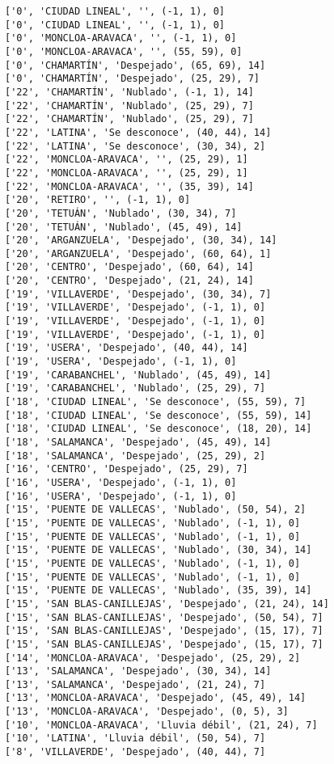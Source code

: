 \documentclass[11pt]{article}
\begin{document}
\begin{Verbatim}[commandchars=\\\{\}]
['0', 'CIUDAD LINEAL', '', (-1, 1), 0]
['0', 'CIUDAD LINEAL', '', (-1, 1), 0]
['0', 'MONCLOA-ARAVACA', '', (-1, 1), 0]
['0', 'MONCLOA-ARAVACA', '', (55, 59), 0]
['0', 'CHAMARTÍN', 'Despejado', (65, 69), 14]
['0', 'CHAMARTÍN', 'Despejado', (25, 29), 7]
['22', 'CHAMARTÍN', 'Nublado', (-1, 1), 14]
['22', 'CHAMARTÍN', 'Nublado', (25, 29), 7]
['22', 'CHAMARTÍN', 'Nublado', (25, 29), 7]
['22', 'LATINA', 'Se desconoce', (40, 44), 14]
['22', 'LATINA', 'Se desconoce', (30, 34), 2]
['22', 'MONCLOA-ARAVACA', '', (25, 29), 1]
['22', 'MONCLOA-ARAVACA', '', (25, 29), 1]
['22', 'MONCLOA-ARAVACA', '', (35, 39), 14]
['20', 'RETIRO', '', (-1, 1), 0]
['20', 'TETUÁN', 'Nublado', (30, 34), 7]
['20', 'TETUÁN', 'Nublado', (45, 49), 14]
['20', 'ARGANZUELA', 'Despejado', (30, 34), 14]
['20', 'ARGANZUELA', 'Despejado', (60, 64), 1]
['20', 'CENTRO', 'Despejado', (60, 64), 14]
['20', 'CENTRO', 'Despejado', (21, 24), 14]
['19', 'VILLAVERDE', 'Despejado', (30, 34), 7]
['19', 'VILLAVERDE', 'Despejado', (-1, 1), 0]
['19', 'VILLAVERDE', 'Despejado', (-1, 1), 0]
['19', 'VILLAVERDE', 'Despejado', (-1, 1), 0]
['19', 'USERA', 'Despejado', (40, 44), 14]
['19', 'USERA', 'Despejado', (-1, 1), 0]
['19', 'CARABANCHEL', 'Nublado', (45, 49), 14]
['19', 'CARABANCHEL', 'Nublado', (25, 29), 7]
['18', 'CIUDAD LINEAL', 'Se desconoce', (55, 59), 7]
['18', 'CIUDAD LINEAL', 'Se desconoce', (55, 59), 14]
['18', 'CIUDAD LINEAL', 'Se desconoce', (18, 20), 14]
['18', 'SALAMANCA', 'Despejado', (45, 49), 14]
['18', 'SALAMANCA', 'Despejado', (25, 29), 2]
['16', 'CENTRO', 'Despejado', (25, 29), 7]
['16', 'USERA', 'Despejado', (-1, 1), 0]
['16', 'USERA', 'Despejado', (-1, 1), 0]
['15', 'PUENTE DE VALLECAS', 'Nublado', (50, 54), 2]
['15', 'PUENTE DE VALLECAS', 'Nublado', (-1, 1), 0]
['15', 'PUENTE DE VALLECAS', 'Nublado', (-1, 1), 0]
['15', 'PUENTE DE VALLECAS', 'Nublado', (30, 34), 14]
['15', 'PUENTE DE VALLECAS', 'Nublado', (-1, 1), 0]
['15', 'PUENTE DE VALLECAS', 'Nublado', (-1, 1), 0]
['15', 'PUENTE DE VALLECAS', 'Nublado', (35, 39), 14]
['15', 'SAN BLAS-CANILLEJAS', 'Despejado', (21, 24), 14]
['15', 'SAN BLAS-CANILLEJAS', 'Despejado', (50, 54), 7]
['15', 'SAN BLAS-CANILLEJAS', 'Despejado', (15, 17), 7]
['15', 'SAN BLAS-CANILLEJAS', 'Despejado', (15, 17), 7]
['14', 'MONCLOA-ARAVACA', 'Despejado', (25, 29), 2]
['13', 'SALAMANCA', 'Despejado', (30, 34), 14]
['13', 'SALAMANCA', 'Despejado', (21, 24), 7]
['13', 'MONCLOA-ARAVACA', 'Despejado', (45, 49), 14]
['13', 'MONCLOA-ARAVACA', 'Despejado', (0, 5), 3]
['10', 'MONCLOA-ARAVACA', 'Lluvia débil', (21, 24), 7]
['10', 'LATINA', 'Lluvia débil', (50, 54), 7]
['8', 'VILLAVERDE', 'Despejado', (40, 44), 7]

\end{Verbatim}
\end{document}
